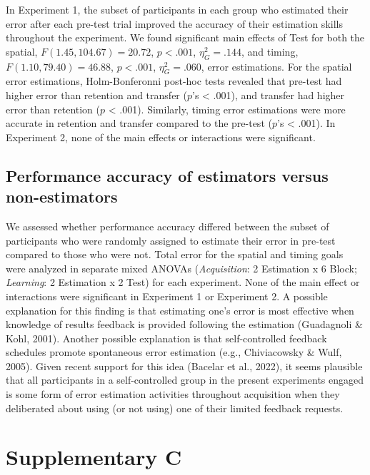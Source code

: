 \documentclass[
  doc, donotrepeattitle,floatsintext]{apa7}
\begin{document}
In Experiment 1, the subset of participants in each group who estimated their error after each pre-test trial improved the accuracy of their estimation skills throughout the experiment. We found significant main effects of Test for both the spatial, \(F(1.45,104.67) = 20.72\), \(p < .001\), \(\eta_{G}^2 = .144\), and timing, \(F(1.10,79.40) = 46.88\), \(p < .001\), \(\eta_{G}^2 = .060\), error estimations. For the spatial error estimations, Holm-Bonferonni post-hoc tests revealed that pre-test had higher error than retention and transfer (\(p\)'s \textless{} .001), and transfer had higher error than retention (\(p\) \textless{} .001). Similarly, timing error estimations were more accurate in retention and transfer compared to the pre-test (\(p\)'s \textless{} .001). In Experiment 2, none of the main effects or interactions were significant.

\hypertarget{performance-accuracy-of-estimators-versus-non-estimators}{%
\subsection{Performance accuracy of estimators versus non-estimators}\label{performance-accuracy-of-estimators-versus-non-estimators}}

We assessed whether performance accuracy differed between the subset of participants who were randomly assigned to estimate their error in pre-test compared to those who were not. Total error for the spatial and timing goals were analyzed in separate mixed ANOVAs (\emph{Acquisition}: 2 Estimation x 6 Block; \emph{Learning}: 2 Estimation x 2 Test) for each experiment. None of the main effect or interactions were significant in Experiment 1 or Experiment 2. A possible explanation for this finding is that estimating one's error is most effective when knowledge of results feedback is provided following the estimation (Guadagnoli \& Kohl, 2001). Another possible explanation is that self-controlled feedback schedules promote spontaneous error estimation (e.g., Chiviacowsky \& Wulf, 2005). Given recent support for this idea (Bacelar et al., 2022), it seems plausible that all participants in a self-controlled group in the present experiments engaged is some form of error estimation activities throughout acquisition when they deliberated about using (or not using) one of their limited feedback requests.

\clearpage

\hypertarget{supplementary-c}{%
\section{Supplementary C}\label{supplementary-c}}
\end{document}
